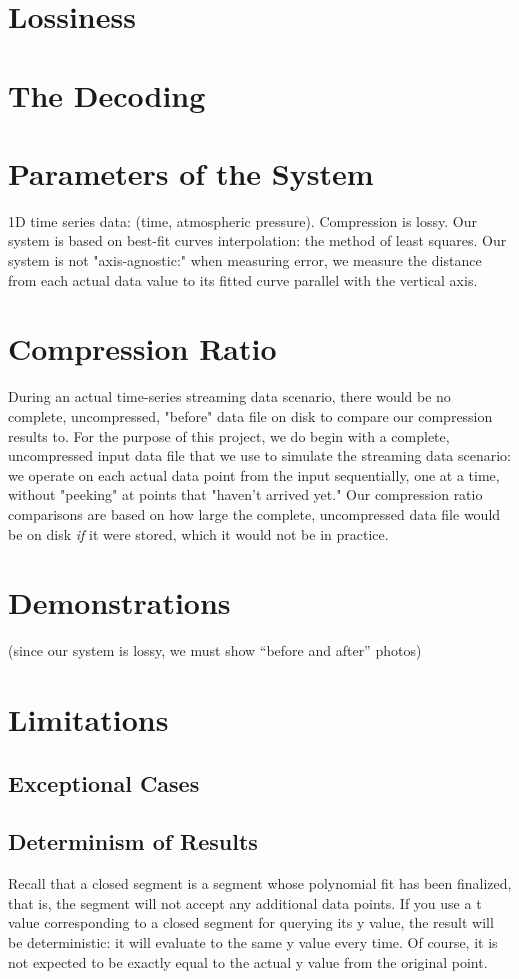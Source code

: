 \documentclass{article}
\begin{document}
\section{Lossiness}

\section{The Decoding}

\section{Parameters of the System}
1D time series data: (time, atmospheric pressure).
Compression is lossy.
Our system is based on best-fit curves interpolation: the method of least squares.
Our system is not "axis-agnostic:" when measuring error, we measure the distance from each actual data value to its fitted curve parallel with the vertical axis.

\section{Compression Ratio}
During an actual time-series streaming data scenario, there would be no complete, uncompressed, "before" data file on disk to compare our compression results to. For the purpose of this project, we do begin with a complete, uncompressed input data file that we use to simulate the streaming data scenario: we operate on each actual data point from the input sequentially, one at a time, without "peeking" at points that "haven't arrived yet." Our compression ratio comparisons are based on how large the complete, uncompressed data file would be on disk \textit{if} it were stored, which it would not be in practice.



\section{Demonstrations}
(since our system is lossy, we must show “before and after” photos)

\section{Limitations}
\subsection{Exceptional Cases}

\subsection{Determinism of Results}
Recall that a closed segment is a segment whose polynomial fit has been finalized, that is, the segment will not accept any additional data points. If you use a t value corresponding to a closed segment for querying its y value, the result will be deterministic: it will evaluate to the same y value every time. Of course, it is not expected to be exactly equal to the actual y value from the original point.
\end{document}
